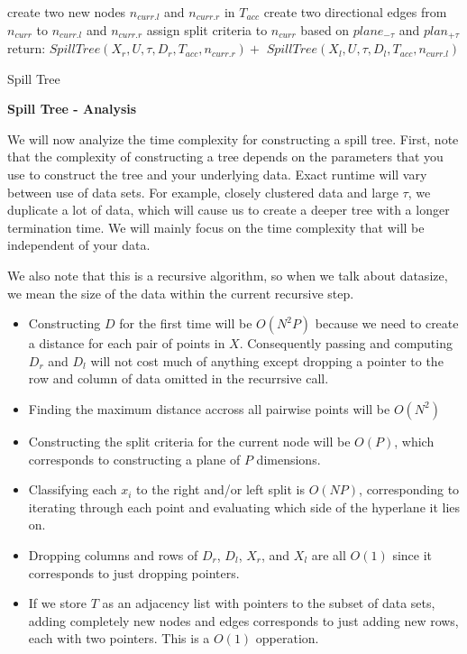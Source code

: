 \begin{algorithm}[ht!]
{{{            
        }
        create two new nodes $n_{curr.l}$ and $n_{curr.r}$ in $T_{acc}$ \;
        create two directional edges from $n_{curr}$ to $n_{curr.l}$ and $n_{curr.r}$ \;
        assign split criteria to $n_{curr}$ based on $plane_{-\tau}$ and $plan_{+\tau}$
        return: $SpillTree(X_{r}, U, \tau, D_{r}, T_{acc}, n_{curr.r}) + $\; 
        \hspace{10pt} $SpillTree(X_{l}, U, \tau, D_{l}, T_{acc}, n_{curr.l})$
    }
}
\caption{Spill Tree\label{ST1}}
\end{algorithm}

\vspace{5 mm}
\noindent
\textbf{Spill Tree - Analysis}

\vspace{5 mm}
\noindent
We will now analyize the time complexity for constructing a spill tree. First, 
note that the complexity of constructing a tree depends on the parameters that 
you use to construct the tree and your underlying data. Exact runtime will 
vary between use of data sets. For example, closely clustered data and large 
$\tau$, we duplicate a lot of data, which will cause us to create a deeper tree 
with a longer termination time. We will mainly focus on the time complexity 
that will be independent of your data.

\vspace{5 mm}
\noindent
We also note that this is a recursive algorithm, so when we talk about 
datasize, we mean the size of the data within the current recursive step.

\begin{itemize}
\item Constructing $D$ for the first time will be $O(N^{2} P)$ because we need 
to create a distance for each pair of points in $X$. Consequently passing and 
computing $D_{r}$ and $D_{l}$ will not cost much of anything except dropping a 
pointer to the row and column of data omitted in the recurrsive call.
\item Finding the maximum distance accross all pairwise points will be 
$O(N^{2})$
\item Constructing the split criteria for the current node will be $O(P)$, 
which corresponds to constructing a plane of $P$ dimensions.
\item Classifying each $x_{i}$ to the right and/or left split is $O(N P)$, 
corresponding to iterating through each point and evaluating which side of the 
hyperlane it lies on.
\item Dropping columns and rows of $D_{r}$, $D_{l}$, $X_{r}$, and $X_{l}$ are 
all $O(1)$ since it corresponds to just dropping pointers.
\item If we store $T$ as an adjacency list with pointers to the subset of data 
sets, adding completely new nodes and edges corresponds to just adding new rows, 
each with two pointers. This is a $O(1)$ opperation.
\end{itemize}


